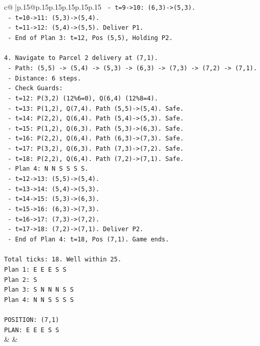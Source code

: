 \documentclass{article}
\begin{document}
{\begin{supertabular}{c@{$\;$}|p{.15\linewidth}@{}p{.15\linewidth}p{.15\linewidth}p{.15\linewidth}p{.15\linewidth}p{.15\linewidth}}
{{{\texttt{     {-} t=9{-}>10: (6,3){-}>(5,3).} \\
\texttt{     {-} t=10{-}>11: (5,3){-}>(5,4).} \\
\texttt{     {-} t=11{-}>12: (5,4){-}>(5,5). Deliver P1.} \\
\texttt{   {-} End of Plan 3: t=12, Pos (5,5), Holding P2.} \\
\\ 
\texttt{4. Navigate to Parcel 2 delivery at (7,1).} \\
\texttt{   {-} Path: (5,5) {-}> (5,4) {-}> (5,3) {-}> (6,3) {-}> (7,3) {-}> (7,2) {-}> (7,1).} \\
\texttt{   {-} Distance: 6 steps.} \\
\texttt{   {-} Check Guards:} \\
\texttt{     {-} t=12: P(3,2) (12\%6=0), Q(6,4) (12\%8=4).} \\
\texttt{     {-} t=13: P(1,2), Q(7,4). Path (5,5){-}>(5,4). Safe.} \\
\texttt{     {-} t=14: P(2,2), Q(6,4). Path (5,4){-}>(5,3). Safe.} \\
\texttt{     {-} t=15: P(1,2), Q(6,3). Path (5,3){-}>(6,3). Safe.} \\
\texttt{     {-} t=16: P(2,2), Q(6,4). Path (6,3){-}>(7,3). Safe.} \\
\texttt{     {-} t=17: P(3,2), Q(6,3). Path (7,3){-}>(7,2). Safe.} \\
\texttt{     {-} t=18: P(2,2), Q(6,4). Path (7,2){-}>(7,1). Safe.} \\
\texttt{   {-} Plan 4: N N S S S S.} \\
\texttt{     {-} t=12{-}>13: (5,5){-}>(5,4).} \\
\texttt{     {-} t=13{-}>14: (5,4){-}>(5,3).} \\
\texttt{     {-} t=14{-}>15: (5,3){-}>(6,3).} \\
\texttt{     {-} t=15{-}>16: (6,3){-}>(7,3).} \\
\texttt{     {-} t=16{-}>17: (7,3){-}>(7,2).} \\
\texttt{     {-} t=17{-}>18: (7,2){-}>(7,1). Deliver P2.} \\
\texttt{   {-} End of Plan 4: t=18, Pos (7,1). Game ends.} \\
\\ 
\texttt{Total ticks: 18. Well within 25.} \\
\texttt{Plan 1: E E E S S} \\
\texttt{Plan 2: S} \\
\texttt{Plan 3: S N N N S S} \\
\texttt{Plan 4: N N S S S S} \\
\\ 
\texttt{POSITION: (7,1)} \\
\texttt{PLAN: E E E S S} \\
            }
        }
    }
    & & \\ \\


\end{supertabular}}
\end{document}
